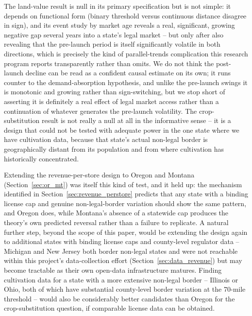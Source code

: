 ﻿\documentclass{article}
\begin{document}
The land-value result is null in its primary specification but is not simple: it depends on functional
form (binary threshold versus continuous distance disagree in sign), and its event study by market age
reveals a real, significant, growing negative gap several years into a state's legal market -- but only
after also revealing that the pre-launch period is itself significantly volatile in both directions, which
is precisely the kind of parallel-trends complication this research program reports transparently rather
than omits. We do not think the post-launch decline can be read as a confident causal estimate on its own;
it runs counter to the demand-absorption hypothesis, and unlike the pre-launch swings it is monotonic and
growing rather than sign-switching, but we stop short of asserting it is definitely a real effect of legal
market access rather than a continuation of whatever generates the pre-launch volatility. The
crop-substitution result is not really a null at all in the
informative sense -- it is a design that could not be tested with adequate power in the one state where we
have cultivation data, because that state's actual non-legal border is geographically distant from its
population and from where cultivation has historically concentrated.

Extending the revenue-per-store design to Oregon and Montana (Section~\ref{sec:or_mt}) was itself this kind
of test, and it held up: the mechanism identified in Section~\ref{sec:revenue_perstore} predicts that any
state with a binding license cap and genuine non-legal-border variation should show the same pattern, and
Oregon does, while Montana's absence of a statewide cap produces the theory's own predicted reversal rather
than a failure to replicate. A natural further step, beyond the scope of this paper, would be extending the
design again to additional states with binding license caps and county-level regulator data -- Michigan and
New Jersey both border non-legal states and were not reachable within this project's data-collection effort
(Section~\ref{sec:data_revenue}) but may become tractable as their own open-data infrastructure matures.
Finding cultivation data for a state with a more extensive non-legal border -- Illinois or Ohio, both of
which have substantial county-level border variation at the 70-mile threshold -- would also be considerably
better candidates than Oregon for the crop-substitution question, if comparable license data can be
obtained.
\end{document}
